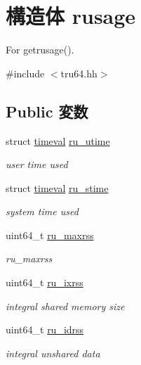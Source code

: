 \hypertarget{structTru64_1_1rusage}{
\section{構造体 rusage}
\label{structTru64_1_1rusage}
}


For getrusage().  


{\ttfamily \#include $<$tru64.hh$>$}\subsection*{Public 変数}
\begin{DoxyCompactItemize}
\item 
struct \hyperlink{structOperatingSystem_1_1timeval}{timeval} \hyperlink{structTru64_1_1rusage_a40e27c5d4340b0c6532787d6740b22ab}{ru\_\-utime}
\begin{DoxyCompactList}\small\item\em user time used \item\end{DoxyCompactList}\item 
struct \hyperlink{structOperatingSystem_1_1timeval}{timeval} \hyperlink{structTru64_1_1rusage_a15f836efd7b69c0a0eb19f5d9505e3e9}{ru\_\-stime}
\begin{DoxyCompactList}\small\item\em system time used \item\end{DoxyCompactList}\item 
uint64\_\-t \hyperlink{structTru64_1_1rusage_a18ca792cc3096b531c56f927a8529e33}{ru\_\-maxrss}
\begin{DoxyCompactList}\small\item\em ru\_\-maxrss \item\end{DoxyCompactList}\item 
uint64\_\-t \hyperlink{structTru64_1_1rusage_aeeb78e75e86d62b485307cf394a033e6}{ru\_\-ixrss}
\begin{DoxyCompactList}\small\item\em integral shared memory size \item\end{DoxyCompactList}\item 
uint64\_\-t \hyperlink{structTru64_1_1rusage_a3bcd09d2a9febd230bd9f391e3fd81e9}{ru\_\-idrss}
\begin{DoxyCompactList}\small\item\em integral unshared data  \item\end{DoxyCompactList}\item 

\end{DoxyCompactItemize}
